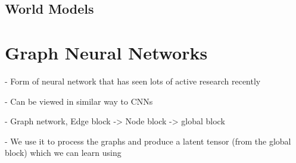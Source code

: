 \subsection{World Models}

\section{Graph Neural Networks}

- Form of neural network that has seen lots of active research recently

- Can be viewed in similar way to CNNs

- Graph network, Edge block -> Node block -> global block

- We use it to process the graphs and produce a latent tensor (from the global block) which we can learn using
